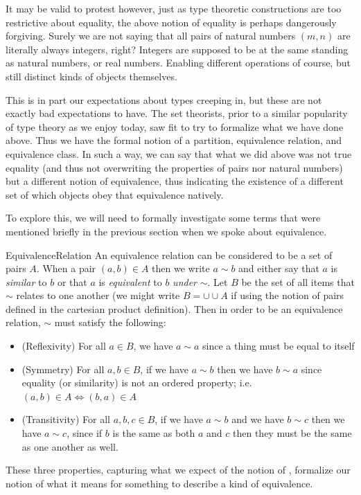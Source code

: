 \documentclass[11pt]{article}
\begin{document}
It may be valid to protest however, just as type theoretic constructions are too restrictive about equality, the above notion of equality is perhaps dangerously forgiving. Surely we are not saying that all pairs of natural numbers $(m,n)$ are literally always integers, right? Integers are supposed to be at the same standing as natural numbers, or real numbers. Enabling different operations of course, but still distinct kinds of objects themselves.

This is in part our expectations about types creeping in, but these are not exactly bad expectations to have. The set theorists, prior to a similar popularity of type theory as we enjoy today, saw fit to try to formalize what we have done above. Thus we have the formal notion of a partition, equivalence relation, and equivalence class. In such a way, we can say that what we did above was not true equality (and thus not overwriting the properties of pairs nor natural numbers) but a different notion of equivalence, thus indicating the existence of a different set of which objects obey that equivalence natively.

To explore this, we will need to formally investigate some terms that were mentioned briefly in the previous section when we spoke about equivalence.

\begin{label definition}{EquivalenceRelation}
An equivalence relation can be considered to be a set of pairs $A$. When a pair $(a,b) \in A$ then we write $a \sim b$ and either say that $a$ is \emph{similar} to $b$ or that $a$ is \emph{equivalent} to $b$ \emph{under} $\sim$. Let $B$ be the set of all items that $\sim$ relates to one another (we might write $B = \cup\cup A$ if using the notion of pairs defined in the cartesian product definition). Then in order to be an equivalence relation, $\sim$ must satisfy the following: \begin{itemize}
\item (Reflexivity) For all $a \in B$, we have $a \sim a$ since a thing must be equal to itself
\item (Symmetry) For all $a,b \in B$, if we have $a \sim b$ then we have $b \sim a$ since equality (or similarity) is not an ordered property; i.e. $(a,b) \in A \iff (b,a) \in A$
\item (Transitivity) For all $a,b,c \in B$, if we have $a \sim b$ and we have $b \sim c$ then we have $a \sim c$, since if $b$ is the same as both $a$ and $c$ then they must be the same as one another as well.
\end{itemize}
These three properties, capturing what we expect of the notion of , formalize our notion of what it means for something to describe a kind of equivalence.
\end{label definition}
\end{document}
